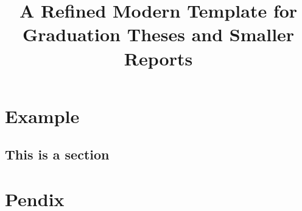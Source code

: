 \documentclass[oneside, 11pt, thesis]{unibothesis}
\title{A Refined Modern Template for\\Graduation Theses and Smaller Reports}
\begin{document}
    \maketitlepage
    \pagestyle{thesis}
    \frontmatter
    \tableofcontents

    \mainmatter
        \chapter{Example}
        \lipsum
        \section{This is a section}
        \lipsum
        
    \appendix
        \chapter{Pendix}
    \backmatter
\end{document}
